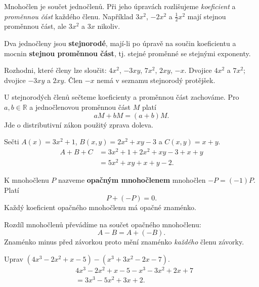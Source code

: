 \documentclass[11pt,a4paper]{article}
\begin{document}
Mnohočlen je součet jednočlenů. Při jeho úpravách rozlišujeme \emph{koeficient} a \emph{proměnnou část} každého členu. Například $3x^2$, $-2x^2$ a $\frac12x^2$ mají stejnou proměnnou část, ale $3x^2$ a $3x$ nikoliv.
\begin{definiceBox}[title={Definice - Stejnorodé členy}]
Dva jednočleny jsou \textbf{stejnorodé}, mají-li po úpravě na součin koeficientu a mocnin \textbf{stejnou proměnnou část}, tj. stejné proměnné se stejnými exponenty.
\end{definiceBox}
\begin{prikladReseniBox}[title={Příklad 1}]
Rozhodni, které členy lze sloučit: $4x^2$, $-3xy$, $7x^2$, $2xy$, $-x$.
\tcblower
Dvojice $4x^2$ a $7x^2$; dvojice $-3xy$ a $2xy$. Člen $-x$ nemá v seznamu stejnorodý protějšek.
\end{prikladReseniBox}
\begin{definiceBox}[title={Věta - Slučování stejnorodých členů}]
U stejnorodých členů sečteme koeficienty a proměnnou část zachováme. Pro $a,b\in\mathbb R$ a jednočlenovou proměnnou část $M$ platí
\[aM+bM=(a+b)M.\]
Jde o distributivní zákon použitý zprava doleva.
\end{definiceBox}
\begin{prikladReseniBox}[title={Příklad 2}]
Sečti $A(x)=3x^2+1$, $B(x,y)=2x^2+xy-3$ a $C(x,y)=x+y$.
\tcblower
\begin{align*}
A+B+C&=3x^2+1+2x^2+xy-3+x+y\\
&=5x^2+xy+x+y-2.
\end{align*}
\end{prikladReseniBox}
\begin{definiceBox}[title={Definice - Opačný mnohočlen}]
K mnohočlenu $P$ nazveme \textbf{opačným mnohočlenem} mnohočlen $-P=(-1)P$. Platí
\[P+(-P)=0.\]
Každý koeficient opačného mnohočlenu má opačné znaménko.
\end{definiceBox}
\begin{definiceBox}[title={Věta - Odčítání mnohočlenů}]
Rozdíl mnohočlenů převádíme na součet opačného mnohočlenu:
\[A-B=A+(-B).\]
Znaménko minus před závorkou proto mění znaménko \emph{každého} členu závorky.
\end{definiceBox}
\begin{prikladReseniBox}[title={Příklad 3}]
Uprav $(4x^3-2x^2+x-5)-(x^3+3x^2-2x-7)$.
\tcblower
\begin{align*}
&4x^3-2x^2+x-5-x^3-3x^2+2x+7\\
&=3x^3-5x^2+3x+2.
\end{align*}
\end{prikladReseniBox}
\end{document}
